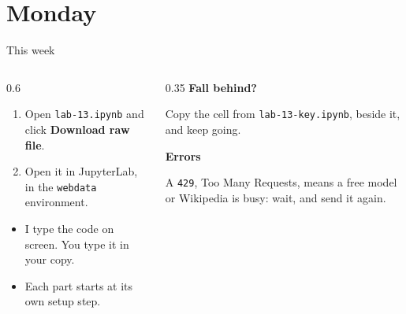 \documentclass[9pt,aspectratio=169]{beamer}
\begin{document}
\section{Monday}


\begin{frame}{This week}
    \begin{columns}[T]
        \begin{column}{0.6\textwidth}
            \begin{enumerate}\small
                \item Open \texttt{lab-13.ipynb} and click \textbf{Download raw file}.
                \item Open it in JupyterLab, in the \texttt{webdata} environment.
            \end{enumerate}
            \medskip
            \begin{itemize}\small
                \item I type the code on screen. You type it in your copy.
                \item Each part starts at its own setup step.
            \end{itemize}
        \end{column}
        \begin{column}{0.35\textwidth}
            \textbf{Fall behind?}\\[2pt]
            {\footnotesize Copy the cell from \texttt{lab-13-key.ipynb}, beside it, and keep going.\par}
            \medskip
            \textbf{Errors}\\[2pt]
            {\footnotesize A \texttt{429}, Too Many Requests, means a free model or Wikipedia is busy: wait, and send it again.\par}
        \end{column}
    \end{columns}
\end{frame}
\end{document}
